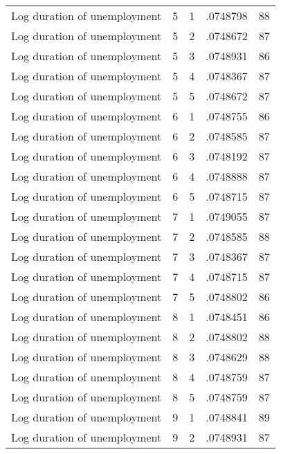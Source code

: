 \begin{tabular}{l*{4}{c}}
Log duration of unemployment&           5&           1&    .0748798&          88\\
Log duration of unemployment&           5&           2&    .0748672&          87\\
Log duration of unemployment&           5&           3&    .0748931&          86\\
Log duration of unemployment&           5&           4&    .0748367&          87\\
Log duration of unemployment&           5&           5&    .0748672&          87\\
Log duration of unemployment&           6&           1&    .0748755&          86\\
Log duration of unemployment&           6&           2&    .0748585&          87\\
Log duration of unemployment&           6&           3&    .0748192&          87\\
Log duration of unemployment&           6&           4&    .0748888&          87\\
Log duration of unemployment&           6&           5&    .0748715&          87\\
Log duration of unemployment&           7&           1&    .0749055&          87\\
Log duration of unemployment&           7&           2&    .0748585&          88\\
Log duration of unemployment&           7&           3&    .0748367&          87\\
Log duration of unemployment&           7&           4&    .0748715&          87\\
Log duration of unemployment&           7&           5&    .0748802&          86\\
Log duration of unemployment&           8&           1&    .0748451&          86\\
Log duration of unemployment&           8&           2&    .0748802&          88\\
Log duration of unemployment&           8&           3&    .0748629&          88\\
Log duration of unemployment&           8&           4&    .0748759&          87\\
Log duration of unemployment&           8&           5&    .0748759&          87\\
Log duration of unemployment&           9&           1&    .0748841&          89\\
Log duration of unemployment&           9&           2&    .0748931&          87\\

\end{tabular}
